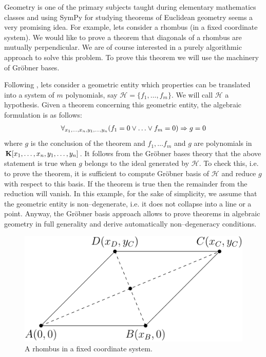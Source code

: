 Geometry is one of the primary subjects taught during elementary mathematics classes and using SymPy for
studying theorems of Euclidean geometry seems a very promising idea. For example, lets consider a rhombus
(in a fixed coordinate system). We would like to prove a theorem that diagonals of a rhombus are mutually
perpendicular. We are of course interested in a purely algorithmic approach to solve this problem. To prove
this theorem we will use the machinery of Gröbner bases.

Following \cite{Winkler1990geometry}, lets consider a geometric entity which properties can be translated into a
system of $m$ polynomials, say $\mathcal{H} = \{f_1, \ldots, f_m\}$. We will call $\mathcal{H}$ a hypothesis.
Given a theorem concerning this geometric entity, the algebraic formulation is as follows:
\begin{gather}
\begin{split}\forall_{x_1, \ldots, x_n, y_1, \ldots, y_n} (f_1 = 0 \vee \ldots \vee f_m = 0) \Rightarrow g = 0\end{split}\notag
\end{gather}
where $g$ is the conclusion of the theorem and $f_1, \ldots f_m$ and $g$ are polynomials in $\mathbf{K}[x_1, \ldots,
x_n, y_1, \ldots, y_n]$. It follows from the Gröbner bases theory that the above statement is true when $g$
belongs to the ideal generated by $\mathcal{H}$. To check this, i.e. to prove the theorem, it is sufficient
to compute Gröbner basis of $\mathcal{H}$ and reduce $g$ with respect to this basis. If the theorem is
true then the remainder from the reduction will vanish. In this example, for the sake of simplicity, we
assume that the geometric entity is non--degenerate, i.e. it does not collapse into a line or a point.
Anyway, the Gröbner basis approach allows to prove theorems in algebraic geometry in full generality
and derive automatically non--degeneracy conditions.
\begin{figure}[htbp]
\centering

\includegraphics{geometry-rhombus.pdf}
\caption{A rhombus in a fixed coordinate system.\label{fig-geometry-rhombus}}\end{figure}

